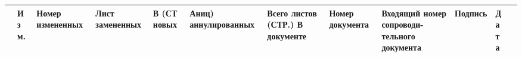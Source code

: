 \documentclass[11pt,a4paper]{article}
\begin{document}
\begin{center}\small\begin{tabularx}{\linewidth}{|>{\raggedright\arraybackslash\hsize=0.176\hsize}X|>{\raggedright\arraybackslash\hsize=0.706\hsize}X|>{\raggedright\arraybackslash\hsize=1.059\hsize}X|>{\raggedright\arraybackslash\hsize=1.059\hsize}X|>{\raggedright\arraybackslash\hsize=1.059\hsize}X|>{\raggedright\arraybackslash\hsize=1.059\hsize}X|>{\raggedright\arraybackslash\hsize=1.235\hsize}X|>{\raggedright\arraybackslash\hsize=1.588\hsize}X|>{\raggedright\arraybackslash\hsize=1.941\hsize}X|>{\raggedright\arraybackslash\hsize=1.235\hsize}X|>{\raggedright\arraybackslash\hsize=0.706\hsize}X|>{\raggedright\arraybackslash\hsize=0.176\hsize}X|}\hline
 & \small\bfseries\hspace{0pt}И з м. & \small\bfseries\hspace{0pt}Номер измененных & \small\bfseries\hspace{0pt}Лист замененных & \small\bfseries\hspace{0pt}В (СТ новых & \small\bfseries\hspace{0pt}Аниц) аннулированных & \small\bfseries\hspace{0pt}Всего листов (СТР.) В документе & \small\bfseries\hspace{0pt}Номер документа & \small\bfseries\hspace{0pt}Входящий номер сопроводи-тельного документа & \small\bfseries\hspace{0pt}Подпись & \small\bfseries\hspace{0pt}Д а т а &  \\ \hline
\end{tabularx}\end{center}
\end{document}
